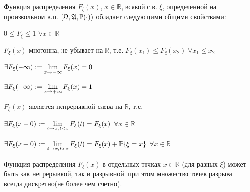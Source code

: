 \begin{proofs}
	Функция распределения $F_{\xi}(x)$, $x \in \mathbb{R}$, всякой с.в. $\xi$, определенной на произвольном в.п.
	$(\Omega, \mathfrak{A}, \mathbb{P}(\cdot))$ обладает следующими общими свойствами:
	\begin{enumerate*}
	\item $0 \leq F_{\xi} \leq 1$ $\forall x \in \mathbb{R}$
	\item $F_{\xi}(x)$ мнотонна, не убывает на $\mathbb{R}$, т.е. $F_{\xi}(x_1) \leq F_{\xi}(x_2)$ $\forall x_1 \leq x_2$
	\item
		$\exists F_{\xi}(-\infty) := \lim\limits_{x \to -\infty}F_{\xi}(x) = 0$

		$\exists F_{\xi}(+\infty) := \lim\limits_{x \to +\infty}F_{\xi}(x) = 1$
	\item $F_{\xi}(x)$ является непрерывной слева на $\mathbb{R}$, т.е.

		$\exists F_{\xi}(x-0) := \lim\limits_{t \to x, t < x}F_{\xi}(t) = F_{\xi}(x)$ $\forall x \in \mathbb{R}$
	\item
		$\exists F_{\xi}(x+0) := \lim\limits_{t \to x, t > x}F_{\xi}(t) = F_{\xi}(x) + \mathbb{P}\{\xi = x\}$ $\forall x \in \mathbb{R}$

	\item Функция распределения $F_{\xi}(x)$ в отдельных точках $x \in \mathbb{R}$ (для разных $\xi$) может быть как непрерывной, так и разрывной, при этом
	множество точек разрыва всегда дискретно(не более чем счетно).
	\end{enumerate*}
\end{proofs}

